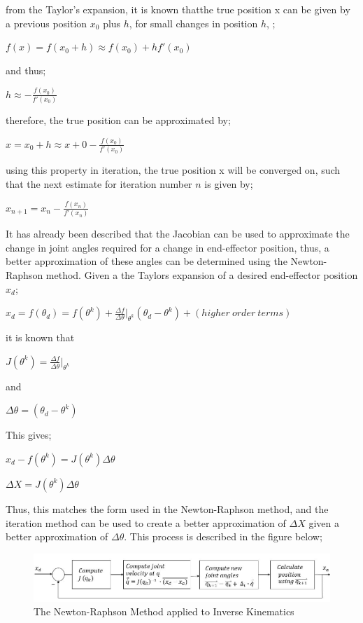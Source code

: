 \documentclass[12pt,openany,a4paper]{book}
\begin{document}
from the Taylor's expansion, it is known thatthe true position x can be given by a previous position $x_0$ plus $h$, for small changes in position $h$, ;

$f(x) = f(x_0 + h) \approx f(x_0) + h f'(x_0)$

and thus;

$h \approx - \frac{f(x_0)}{f'(x_0)}$

therefore, the true position can be approximated by;

$x = x_0 + h \approx x+0 - \frac{f(x_0)}{f'(x_0)}$

using this property in iteration, the true position x will be converged on, such that the next estimate for iteration number $n$ is given by;

$x_{n+1} = x_n - \frac{f(x_n)}{f'(x_n)}$

It has already been described that the Jacobian can be used to approximate the change in joint angles required for a change in end-effector position, thus, a better approximation of these angles can be determined using the Newton-Raphson method. Given a the Taylors expansion of a desired end-effector position $x_d$;

$x_d = f( \theta _d ) = f( \theta ^k ) + \frac{ \Delta f }{ \Delta \theta } |_{ \theta ^k } ( \theta_d - \theta^k ) + ( higher\ order\ terms )$

it is known that

$J(\theta^k) = \frac{\Delta f}{\Delta \theta} |_{\theta^k}$

and

$\Delta \theta = (\theta_d - \theta^k)$

This gives;

$x_d - f(\theta^k) = J(\theta^k) \Delta \theta$

$\Delta X = J(\theta^k) \Delta \theta$

Thus, this matches the form used in the Newton-Raphson method, and the iteration method can be used to create a better approximation of $\Delta X$ given a better approximation of $\Delta \theta$. This process is described in the figure below;

\begin{center}
\begin{figure}[htb]
  \includegraphics[width=\linewidth]{Newton-Raphson_loop.jpg}
\caption{The Newton-Raphson Method applied to Inverse Kinematics}
\end{figure}
\end{center}
\end{document}
